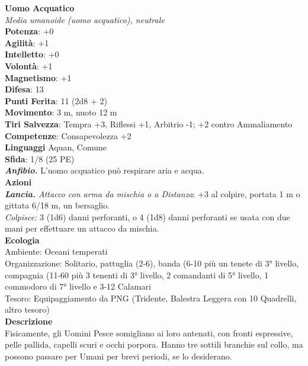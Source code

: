 \begin{multicols}{2}
\medskip\textbf{Uomo Acquatico}\\
\emph{Media umanoide (uomo acquatico), neutrale}\\
\textbf{Potenza}: +0\\
\textbf{Agilità}: +1\\
\textbf{Intelletto}: +0\\
\textbf{Volontà}: +1\\
\textbf{Magnetismo}: +1\\
\textbf{Difesa}: 13\\
\textbf{Punti Ferita}: 11 (2d8 + 2)\\
\textbf{Movimento}: 3 m, nuoto 12 m\\
\textbf{Tiri Salvezza}:  Tempra +3, Riflessi +1, Arbitrio -1; +2 contro Ammaliamento\\
\textbf{Competenze}: Consapevolezza +2\\
\textbf{Linguaggi} Aquan, Comune\\
\textbf{Sfida}: 1/8 (25 PE)\smallskip\\
\emph{\textbf{Anfibio.}} L'uomo acquatico può respirare aria e acqua.\\
\smallskip\textbf{Azioni}\\
\emph{\textbf{Lancia.} Attacco con arma da mischia o a Distanza}: +3 al colpire, portata 1 m o gittata 6/18 m, un bersaglio.\\
\emph{Colpisce:} 3 (1d6) danni perforanti, o 4 (1d8) danni perforanti se usata con due mani per effettuare un attacco da mischia.\\
\textbf{Ecologia}\\
Ambiente: Oceani temperati\\
Organizzazione: Solitario, pattuglia (2-6), banda (6-10 più un tenete di 3° livello, compagnia (11-60 più 3 tenenti di 3° livello, 2 comandanti di 5° livello, 1 commodoro di 7° livello e 3-12 Calamari\\
Tesoro: Equipaggiamento da PNG (Tridente, Balestra Leggera con 10 Quadrelli, altro tesoro)\\
\textbf{Descrizione}\\
Fisicamente, gli Uomini Pesce somigliano ai loro antenati, con fronti espressive, pelle pallida, capelli scuri e occhi porpora. Hanno tre sottili branchie sul collo, ma possono passare per Umani per brevi periodi, se lo desiderano.\\


\end{multicols}
